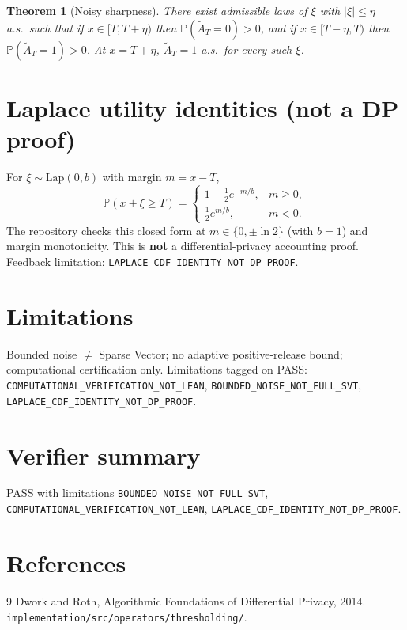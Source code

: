 \documentclass[11pt]{article}
\newtheorem{theorem}{Theorem}
\begin{document}
\begin{theorem}[Noisy sharpness]\label{thm:noisy-sharp}
There exist admissible laws of \(\xi\) with \(\lvert\xi\rvert\le\eta\) a.s.\ such that
if \(x\in[T,T+\eta)\) then \(\mathbb{P}(\widetilde A_T=0)>0\), and if
\(x\in[T-\eta,T)\) then \(\mathbb{P}(\widetilde A_T=1)>0\).
At \(x=T+\eta\), \(\widetilde A_T=1\) a.s.\ for every such \(\xi\).
\end{theorem}

\section{Laplace utility identities (not a DP proof)}
For \(\xi\sim\mathrm{Lap}(0,b)\) with margin \(m=x-T\),
\[
\mathbb{P}(x+\xi\ge T)=
\begin{cases}
1-\tfrac12 e^{-m/b}, & m\ge 0,\\
\tfrac12 e^{m/b}, & m<0.
\end{cases}
\]
The repository checks this closed form at \(m\in\{0,\pm\ln 2\}\) (with \(b=1\))
and margin monotonicity.
This is \textbf{not} a differential-privacy accounting proof.
Feedback limitation: \texttt{LAPLACE\_CDF\_IDENTITY\_NOT\_DP\_PROOF}.

\section{Limitations}
Bounded noise \(\neq\) Sparse Vector; no adaptive positive-release bound;
computational certification only.
Limitations tagged on PASS:
\texttt{COMPUTATIONAL\_VERIFICATION\_NOT\_LEAN},
\texttt{BOUNDED\_NOISE\_NOT\_FULL\_SVT},
\texttt{LAPLACE\_CDF\_IDENTITY\_NOT\_DP\_PROOF}.

\section{Verifier summary}
PASS with limitations
\texttt{BOUNDED\_NOISE\_NOT\_FULL\_SVT},
\texttt{COMPUTATIONAL\_VERIFICATION\_NOT\_LEAN},
\texttt{LAPLACE\_CDF\_IDENTITY\_NOT\_DP\_PROOF}.

\section*{References}
\begin{thebibliography}{9}
Dwork and Roth, Algorithmic Foundations of Differential Privacy, 2014.
\texttt{implementation/src/operators/thresholding/}.
\end{thebibliography}
\end{document}

